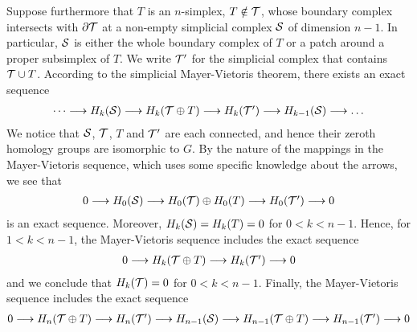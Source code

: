 \documentclass[a4paper]{amsart}
\begin{document}
\begin{remark}
    Suppose furthermore that $T$ is an $n$-simplex, $T \notin {\mathcal T}$, 
    whose boundary complex intersects with $\partial{\mathcal T}$ at a non-empty simplicial complex ${\mathcal S}$ of dimension $n-1$. 
    In particular, ${\mathcal S}$ is either the whole boundary complex of $T$ or a patch around a proper subsimplex of $T$. 
    We write ${\mathcal T}'$ for the  simplicial complex that contains ${\mathcal T} \cup T$.
    According to the simplicial Mayer-Vietoris theorem, there exists an exact sequence 
    \begin{align*}
        \begin{CD}
            \dots \longrightarrow H_{k}(\calS) \longrightarrow H_{k}(\calT \oplus T) \longrightarrow H_{k}(\calT') \longrightarrow H_{k-1}(\calS) \longrightarrow\dots 
        \end{CD}
    \end{align*}
    We notice that ${\mathcal S}$, ${\mathcal T}$, $T$ and ${\mathcal T}'$ are each connected, and hence their zeroth homology groups are isomorphic to ${G}$. 
    By the nature of the mappings in the Mayer-Vietoris sequence, 
    \color{red}which uses some specific knowledge about the arrows\color{black}, 
    we see that 
    \begin{align*}
        \begin{CD}
            0 \longrightarrow H_{0}(\calS) \longrightarrow H_{0}(\calT) \oplus H_{0}(T) \longrightarrow H_{0}(\calT') \longrightarrow 0 
        \end{CD}
    \end{align*}
    is an exact sequence. 
    Moreover, $H_{k}({\mathcal S}) = H_{k}(T) = 0$ for $0 < k < n-1$. Hence, for $1 < k < n-1$,
    the Mayer-Vietoris sequence includes the exact sequence 
    \begin{align*}
        \begin{CD}
            0 \longrightarrow H_{k}(\calT \oplus T) \longrightarrow H_{k}(\calT') \longrightarrow 0 
        \end{CD}
    \end{align*}
    and we conclude that $H_{k}({\mathcal T}) = 0$ for $0 < k < n-1$.
    Finally, the Mayer-Vietoris sequence includes the exact sequence 
    \begin{align*}
        \begin{CD}
            0 \longrightarrow H_{n}(\calT \oplus T) \longrightarrow H_{n}(\calT') \longrightarrow H_{n-1}(\calS) \longrightarrow H_{n-1}(\calT \oplus T) \longrightarrow H_{n-1}(\calT') \longrightarrow 0 
        \end{CD}
    \end{align*}

\end{remark}
\end{document}
